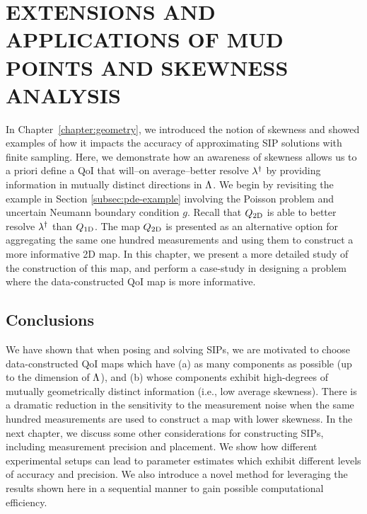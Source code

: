 \chapter{\uppercase{Extensions and Applications of MUD Points and Skewness Analysis} \label{chapter:vector-valued}}

In Chapter~\ref{chapter:geometry}, we introduced the notion of skewness and showed examples of how it impacts the accuracy of approximating SIP solutions with finite sampling.
Here, we demonstrate how an awareness of skewness allows us to a priori define a QoI that will\---on average\---better resolve $\lambda^\dagger$ by providing information in mutually distinct directions in ${\Lambda}$.
We begin by revisiting the example in Section \ref{subsec:pde-example} involving the Poisson problem and uncertain Neumann boundary condition $g$.
Recall that $Q_\text{2D}$ is able to better resolve $\lambda^\dagger$ than $Q_\text{1D}$.
The map $Q_\text{2D}$ is presented as an alternative option for aggregating the same one hundred measurements and using them to construct a more informative 2D map.
In this chapter, we present a more detailed study of the construction of this map, and perform a case-study in designing a problem where the data-constructed QoI map is more informative.


\FloatBarrier


\FloatBarrier





\FloatBarrier


\section{Conclusions}

We have shown that when posing and solving SIPs, we are motivated to choose data-constructed QoI maps which have (a) as many components as possible (up to the dimension of ${\Lambda}$), and (b) whose components exhibit high-degrees of mutually geometrically distinct information (i.e., low average skewness).
There is a dramatic reduction in the sensitivity to the measurement noise when the same hundred measurements are used to construct a map with lower skewness.
In the next chapter, we discuss some other considerations for constructing SIPs, including measurement precision and placement.
We show how different experimental setups can lead to parameter estimates which exhibit different levels of accuracy and precision.
We also introduce a novel method for leveraging the results shown here in a sequential manner to gain possible computational efficiency.
